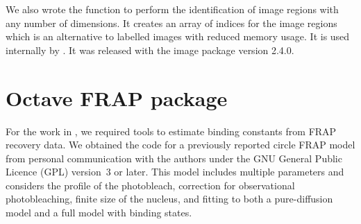 We also wrote the function  to perform the
identification of image regions with any number of dimensions.  It
creates an array of indices for the image regions which is an
alternative to labelled images with reduced memory usage.  It is used
internally by .  It was released with the image
package version 2.4.0.


\section{Octave FRAP package}
\label{sec:software:octave-frap}

For the work in , we required tools to estimate
binding constants from FRAP recovery data.  We obtained the code for a
previously reported circle FRAP model \citep{mcnally-frap-code} from
personal communication with the authors under the GNU General Public
Licence (GPL) version~3 or later.  This model includes multiple
parameters and considers the profile of the photobleach, correction
for observational photobleaching, finite size of the nucleus, and
fitting to both a pure-diffusion model and a full model with binding
states.

